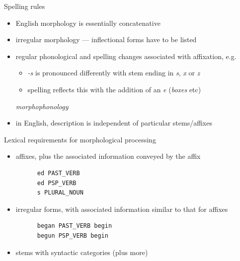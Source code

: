 \documentclass{beamer}
\begin{document}
\begin{frame}{Spelling rules}
  \begin{itemize}
  \item English morphology is essentially concatenative
  \item irregular morphology --- inflectional forms have
    to be listed
  \item regular phonological and spelling 
    changes associated with affixation, e.g.
    \begin{itemize}
    \item {\it -s} is pronounced differently
      with stem ending in {\it s}, {\it x}
      or {\it z}
    \item spelling reflects this with the addition
      of an {\it e} ({\it boxes} etc) 
    \end{itemize}
    \emph{morphophonology}
  \item in English, description is independent of particular stems/affixes
  \end{itemize}
\end{frame}


\begin{frame}[fragile]{Lexical requirements for morphological processing}
  \begin{itemize}
  \item affixes, plus the associated information conveyed by the
    affix
    \begin{verbatim}
      ed PAST_VERB
      ed PSP_VERB 
      s PLURAL_NOUN
    \end{verbatim}
  \item irregular forms, with associated information similar to that for affixes
    \begin{verbatim}
      began PAST_VERB begin
      begun PSP_VERB begin
    \end{verbatim}
  \item stems with syntactic categories (plus more)
  \end{itemize}
\end{frame}
\end{document}
